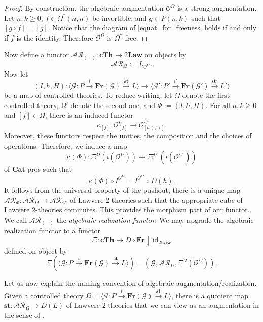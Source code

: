 \documentclass{tac}
\begin{document}
 \begin{proof}
     By construction, the algebraic augmentation $\mathcal{O}^\Omega$ is a strong augmentation. Let $n,k\geq 0$, $f\in\Omega^*(n,n)$ be invertible, and $g\in P(n,k)$ such that $[g\circ f]=[g]$. Notice that the diagram of \ref{equat_for_freeness} holds if and only if $f$ is the identity. Therefore $\mathcal{O}^\Omega$ is $\Omega^*$-free.
 \end{proof}

Now define a functor $\mathcal{AR}_{(-)}:\mathbf{cTh}\to 2\mathbf{Law}$ on objects by
\[
\mathcal{AR}_{\Omega}:=L_{\mathcal{O}^\Omega}.
\]
Now let 
\[
	(I,h,H):\langle \mathcal{G}:P\xrightarrow{i}\mathbf{Fr}(\mathcal{G})\xrightarrow{\mathbf{st}}L\rangle\to \langle \mathcal{G}':P'\xrightarrow{i'}\mathbf{Fr}(\mathcal{G}')\xrightarrow{\mathbf{st}'}L'\rangle
    \] 
be a map of controlled theories. To reduce writing, let $\Omega$ denote the first controlled theory, $\Omega'$ denote the second one, and $\Phi:=(I,h,H)$. For all $n,k\geq 0$ and $[f]\in\overline{\Omega}$, there is an induced functor
\[
\kappa_{[f]}:\mathcal{O}^{\Omega}_{[f]}\to \mathcal{O}^{\Omega'}_{[h(f)]}.
\]
Moreover, these functors respect the unities, the composition and the choices of operations. Therefore, we induce a map 
\[
\kappa(\Phi):\Xi^{\overline{\Omega}}(i(\mathcal{O}^{\Omega}))\to \Xi^{\overline{\Omega'}}(i(\mathcal{O}^{\Omega'}))
\]
 of $\mathbf{Cat}$-pros such that
 \[
 \kappa(\Phi)\circ I^{\mathcal{O}^\Omega}=I^{\mathcal{O}^{\Omega'}}\circ D(h).
 \]
 It follows from the universal property of the pushout, there is a unique map $\mathcal{AR}_{\Phi}:\mathcal{AR}_{\Omega}\to \mathcal{AR}_{\Omega'}$ of Lawvere $2$-theories such that the appropriate cube of Lawvere $2$-theories commutes. This provides the morphism part of our functor. We call $\mathcal{AR}_{(-)}$ the \emph{algebraic realization functor}. We may upgrade the algebraic realization functor to a functor
\[
\Xi:\mathbf{cTh}\to D\circ \mathbf{Fr}\downarrow\text{id}_{2\mathbf{Law}}
\]
defined on object by
\[
\Xi(\langle \mathcal{G}:P\xrightarrow{i}\mathbf{Fr}(\mathcal{G})\xrightarrow{\mathbf{st}}L\rangle)=(\mathcal{G}, \mathcal{AR}_{\Omega}, \Xi^\Omega(\mathcal{O}^\Omega)).
\]

Let us now explain the naming convention of algebraic augmentation/realization. Given a controlled theory $\Omega=\langle \mathcal{G}:P\xrightarrow{i}\mathbf{Fr}(\mathcal{G})\xrightarrow{\mathbf{st}}L\rangle$, there is a quotient map $\mathbf{st}:\mathcal{AR}_{\Omega}\to D(L)$ of Lawvere $2$-theories that we can view as an augmentation in the sense of \cite{SchwanzlVogt1989}.
\end{document}

